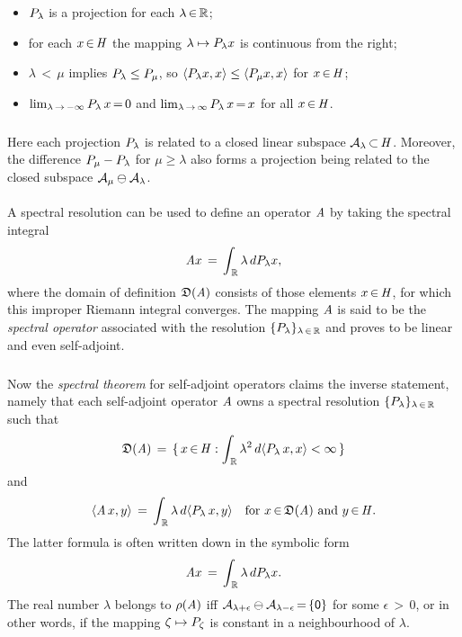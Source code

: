 \documentclass[11pt,twoside]{article}
\begin{document}
\begin{itemize}[leftmargin=4mm,itemsep=5pt]
\begin{itemize}[leftmargin=12mm]
\item[(R-1)]
${P}_{\lambda}$ is a projection for each $\lambda {\,\in\,} {\mathbb{R}}$;
\item[(R-2)]
for each $x {\,\in\,} \mathit{H}$
the mapping $\lambda \mapsto {P}_{\lambda} x$ is continuous from the right;
\item[(R-3)]
$\lambda {\,<\,} \mu$ implies ${P}_{\lambda} \leq {P}_{\mu}$,
so $\langle {P}_{\lambda} x,x \rangle \leq \langle {P}_{\mu} x,x \rangle$
for $x {\,\in\,} \mathit{H}$;
\item[(R-4)]
$\lim_{\lambda {\,\to\,} -\infty} {P}_{\lambda} \, x {\,=\,} 0$
and
$\lim_{\lambda {\,\to\,}  \infty} {P}_{\lambda} \, x {\,=\,} x$
for all $x {\,\in\,} \mathit{H}$.
\end{itemize}

\subparagraph{}
Here each projection ${P}_{\lambda}$ is related
to a closed linear subspace $\mathcal{A}_{\lambda} {\,\subset\,} \mathit{H}$.
Moreover,
the difference ${P}_{\mu} - {P}_{\lambda}$
for $\mu \geq \lambda$ also forms a projection 
being related to the closed subspace $\mathcal{A}_{\mu} \ominus \mathcal{A}_{\lambda}$.

\paragraph{} %
A spectral resolution can be used to define an operator $\mathit{A}$
by taking the spectral integral
\[
\mathit{A} x \,=\, \int_{\,{\mathbb{R}}} \lambda \, d{P}_{\lambda}x,
\]
where the domain of definition $\mathfrak{D}(\mathit{A})$
consists of those elements $x {\,\in\,} \mathit{H}$,
for which this improper Riemann integral converges.
The mapping $\mathit{A}$ is said to be the \textit{spectral operator}
associated with the resolution $\{{P}_{\lambda}\}_{\lambda {\,\in\,} {\mathbb{R}}}$
and proves to be linear and even self-adjoint.

\subparagraph{} %
Now the \textit{spectral theorem} for self-adjoint operators
claims the inverse statement,
namely that each self-adjoint operator $\mathit{A}$
owns a spectral resolution $\{{P}_{\lambda}\}_{\lambda {\,\in\,} {\mathbb{R}}}$
such that
\[
\mathfrak{D}(\mathit{A}) \,=\,
\{\, x {\,\in\,} \mathit{H}:
    \int_{\,{\mathbb{R}}}
\lambda^2 \, d \langle {P}_{\lambda} \,x,x \rangle < \infty\,\}
\]
and
\[
\langle \mathit{A} \, x,y \rangle \,=\,
\int_{\,{\mathbb{R}}} \lambda \, d\langle {P}_{\lambda} \,x,y \rangle
\quad \mbox{for } x {\,\in\,} \mathfrak{D}(\mathit{A}) \mbox{ and } y {\,\in\,} \mathit{H}.
\]
The latter formula is often written down in the symbolic form
\[
\mathit{A} x \,=\, \int_{\,{\mathbb{R}}} \lambda \, d{P}_{\lambda}x.
\]
The real number $\lambda$ belongs to $\rho(\mathit{A})$
iff
$\mathcal{A}_{\lambda + \epsilon} \ominus \mathcal{A}_{\lambda - \epsilon} {\,=\,} \{{\mathsf{0}}\}$
for some $\epsilon {\,>\,} 0$,
or in other words,
if the mapping $\zeta \mapsto {P}_{\zeta}$ is constant
in a neighbourhood of $\lambda$.


\end{itemize}
\end{document}
